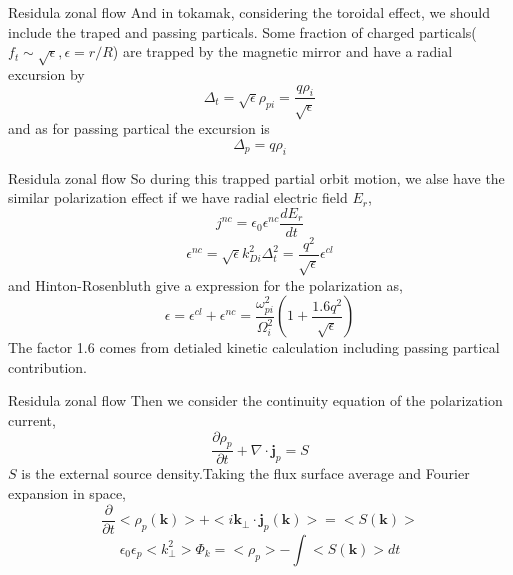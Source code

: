 \documentclass{beamer}
\begin{document}
\begin{frame}{Residula zonal flow}
And in tokamak, considering the toroidal effect, we should include the traped and passing particals. Some fraction of charged particals($f_t\sim\sqrt{\epsilon},\epsilon=r/R$) are trapped by the magnetic mirror and have a radial excursion by 
\begin{equation}
\Delta_t=\sqrt{\epsilon}\rho_{pi}=\frac{q\rho_i}{\sqrt{\epsilon}}
\end{equation}
and as for passing partical the excursion is
\begin{equation}
\Delta_p=q\rho_i
\end{equation}
\end{frame}


\begin{frame}{Residula zonal flow}
So during this trapped partial orbit motion, we alse have the similar polarization effect if we have radial electric field $E_r$, 
\begin{equation}
j^{nc}=\epsilon_0\epsilon^{nc}\frac{dE_r}{dt}
\end{equation}
\begin{equation}
\epsilon^{nc}=\sqrt{\epsilon}k_{Di}^2\Delta_t^2=\frac{q^2}{\sqrt{\epsilon}}\epsilon^{cl}
\end{equation}
and Hinton-Rosenbluth give a expression for the polarization as,
\begin{equation}
\epsilon=\epsilon^{cl}+\epsilon^{nc}=\frac{\omega_{pi}^2}{\Omega_i^2}(1+\frac{1.6q^2}{\sqrt{\epsilon}})
\end{equation}
The factor 1.6 comes from detialed kinetic calculation including passing partical contribution.
\end{frame}

\begin{frame}{Residula zonal flow}
Then we consider the continuity equation of the polarization current,
\begin{equation}
\frac{\partial\rho_p}{\partial{t}}+\nabla\cdot\pmb{j}_p=S		
\end{equation}
$S$ is the external source density.Taking the flux surface average and Fourier expansion in space, 
\begin{equation}
\frac{\partial}{\partial{t}}<\rho_p(\pmb{k})>+<i\pmb{k}_\perp\cdot{\pmb{j}_p}(\pmb{k})>=<S(\pmb{k})>
\end{equation}
\begin{equation}
\epsilon_0\epsilon_p<k_\perp^2>\Phi_k=<\rho_p>-\int<S(\pmb{k})>dt
\end{equation}
\end{frame}
\end{document}
